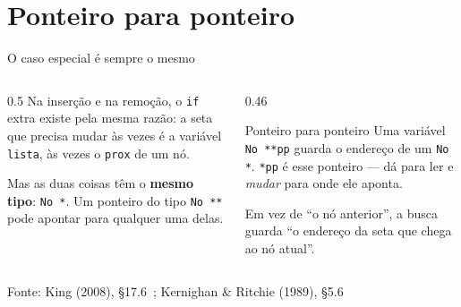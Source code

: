 \documentclass[aspectratio=169]{beamer}
\newcommand{\fonte}[1]{\vfill\hfill{\scriptsize\textcolor{UFSGray}{Fonte: #1}}}
\begin{document}
\section{Ponteiro para ponteiro}

\begin{frame}{O caso especial é sempre o mesmo}
  \begin{columns}[T]
    \begin{column}{0.5\textwidth}
      \small
      Na inserção e na remoção, o \texttt{if} extra existe pela mesma razão:
      a seta que precisa mudar às vezes é a variável \texttt{lista},
      às vezes o \texttt{prox} de um nó.

      \medskip
      Mas as duas coisas têm o \textbf{mesmo tipo}: \texttt{No *}. Um
      ponteiro do tipo \texttt{No **} pode apontar para qualquer uma delas.
    \end{column}
    \begin{column}{0.46\textwidth}
      \begin{block}{Ponteiro para ponteiro}
        \small Uma variável \texttt{No **pp} guarda o endereço de um
        \texttt{No *}. \texttt{*pp} é esse ponteiro --- dá para ler e
        \emph{mudar} para onde ele aponta.
      \end{block}
      \small Em vez de ``o nó anterior'', a busca guarda ``o endereço da
      seta que chega ao nó atual''.
    \end{column}
  \end{columns}
  \fonte{King (2008), §17.6~\cite{king2008c};
    Kernighan \& Ritchie (1989), §5.6~\cite{kernighan1989c}}
\end{frame}
\end{document}
